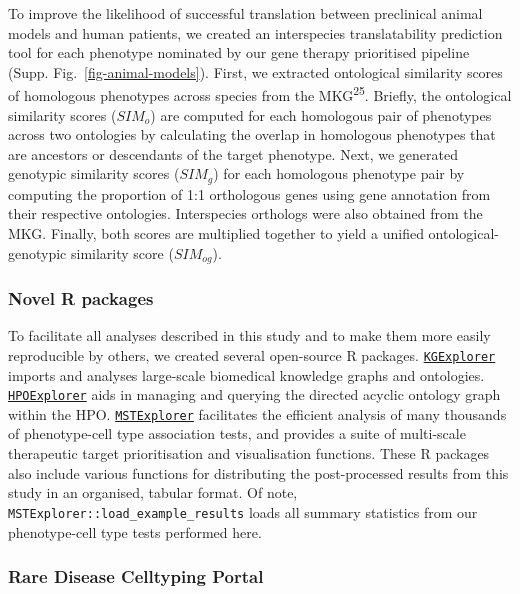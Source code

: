 \documentclass[
]{article}
\begin{document}
To improve the likelihood of successful translation between preclinical
animal models and human patients, we created an interspecies
translatability prediction tool for each phenotype nominated by our gene
therapy prioritised pipeline (Supp. Fig.~\ref{fig-animal-models}).
First, we extracted ontological similarity scores of homologous
phenotypes across species from the MKG\textsuperscript{25}. Briefly, the
ontological similarity scores (\(SIM_o\)) are computed for each
homologous pair of phenotypes across two ontologies by calculating the
overlap in homologous phenotypes that are ancestors or descendants of
the target phenotype. Next, we generated genotypic similarity scores
(\(SIM_g\)) for each homologous phenotype pair by computing the
proportion of 1:1 orthologous genes using gene annotation from their
respective ontologies. Interspecies orthologs were also obtained from
the MKG. Finally, both scores are multiplied together to yield a unified
ontological-genotypic similarity score (\(SIM_{og}\)).

\subsubsection{Novel R packages}\label{novel-r-packages}

To facilitate all analyses described in this study and to make them more
easily reproducible by others, we created several open-source R
packages.
\href{https://github.com/neurogenomics/KGExplorer}{\texttt{KGExplorer}}
imports and analyses large-scale biomedical knowledge graphs and
ontologies.
\href{https://github.com/neurogenomics/HPOExplorer}{\texttt{HPOExplorer}}
aids in managing and querying the directed acyclic ontology graph within
the HPO.
\href{https://github.com/neurogenomics/MSTExplorer}{\texttt{MSTExplorer}}
facilitates the efficient analysis of many thousands of phenotype-cell
type association tests, and provides a suite of multi-scale therapeutic
target prioritisation and visualisation functions. These R packages also
include various functions for distributing the post-processed results
from this study in an organised, tabular format. Of note,
\texttt{MSTExplorer::load\_example\_results} loads all summary
statistics from our phenotype-cell type tests performed here.

\subsubsection{Rare Disease Celltyping
Portal}\label{rare-disease-celltyping-portal}
\end{document}

